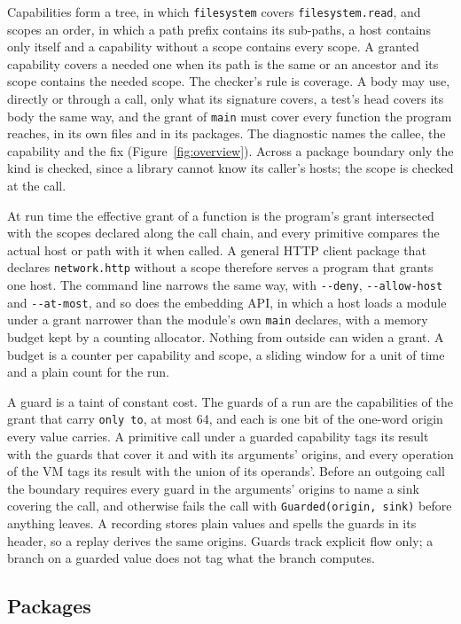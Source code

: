 \documentclass[11pt]{article}
\begin{document}
Capabilities form a tree, in which \texttt{filesystem} covers
\texttt{filesystem.read}, and scopes an order, in which a path prefix
contains its sub-paths, a host contains only itself and a capability
without a scope contains every scope. A granted capability covers a
needed one when its path is the same or an ancestor and its scope
contains the needed scope. The checker's rule is coverage. A body may
use, directly or through a call, only what its signature covers, a
test's head covers its body the same way, and the grant of
\texttt{main} must cover every function the program reaches, in its own
files and in its packages. The diagnostic names the callee, the
capability and the fix (Figure~\ref{fig:overview}). Across a package
boundary only the kind is checked, since a library cannot know its
caller's hosts; the scope is checked at the call.

At run time the effective grant of a function is the program's grant
intersected with the scopes declared along the call chain, and every
primitive compares the actual host or path with it when called. A
general HTTP client package that declares \texttt{network.http} without
a scope therefore serves a program that grants one host. The command
line narrows the same way, with \texttt{-{}-deny},
\texttt{-{}-allow-host} and \texttt{-{}-at-most}, and so does the
embedding API, in which a host loads a module under a grant narrower
than the module's own \texttt{main} declares, with a memory budget kept
by a counting allocator. Nothing from outside can widen a grant. A
budget is a counter per capability and scope, a sliding window for a
unit of time and a plain count for the run.

A guard is a taint of constant cost. The guards of a run are the
capabilities of the grant that carry \texttt{only to}, at most 64, and
each is one bit of the one-word origin every value carries. A primitive
call under a guarded capability tags its result with the guards that
cover it and with its arguments' origins, and every operation of the VM
tags its result with the union of its operands'. Before an outgoing
call the boundary requires every guard in the arguments' origins to
name a sink covering the call, and otherwise fails the call with
\texttt{Guarded(origin, sink)} before anything leaves. A recording
stores plain values and spells the guards in its header, so a replay
derives the same origins. Guards track explicit flow only; a branch on
a guarded value does not tag what the branch computes.

\subsection{Packages}
\end{document}
